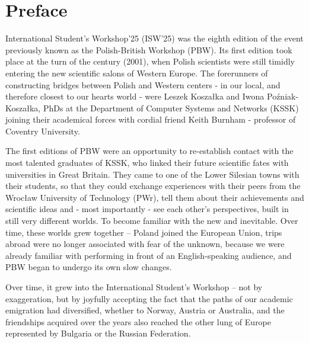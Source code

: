 \documentclass[
    letterpaper,
    10pt,%
    printed,%
    twoside,
    twosidepapers,
    papers=countpages,%
    paperselec=all, %
    hyperref={
        bookmarksdepth=1,
        bookmarksopen,
        bookmarksopenlevel=0,%
        linkcolor=blue,urlcolor=blue
    },%
    geometry={
        text={122truemm,126truemm},%
        inner=1.85in,top=35.00mm,
        bottom=50.00mm,footskip=10.00mm,
        voffset=-5mm
    },
]{confproc}
\begin{document}
\section*{Preface}
\vspace*{1.1cm}
\doublespace
\begin{center}
  \begin{minipage}[h]{14cm}
    International Student's Workshop'25 (ISW'25) was the eighth edition of the event previously known as the Polish-British Workshop (PBW). Its first edition took place at the turn of the century (2001), when Polish scientists were still timidly entering the new scientific salons of Western Europe. The forerunners of constructing bridges between Polish and Western centers - in our local, and therefore closest to our hearts world - were Leszek Koszałka and Iwona Poźniak-Koszałka, PhDs at the Department of Computer Systems and Networks (KSSK) joining their academical forces with cordial friend Keith Burnham - professor of Coventry University.
  \end{minipage}
\end{center}
\begin{center}
  \begin{minipage}[h]{14cm}
    The first editions of PBW were an opportunity to re-establish contact with the most talented graduates of KSSK, who linked their future scientific fates with universities in Great Britain. They came to one of the Lower Silesian towns with their students, so that they could exchange experiences with their peers from the Wrocław University of Technology (PWr), tell them about their achievements and scientific ideas and - most importantly - see each other's perspectives, built in still very different worlds. To become familiar with the new and inevitable. Over time, these worlds grew together -- Poland joined the European Union, trips abroad were no longer associated with fear of the unknown, because we were already familiar with performing in front of an English-speaking audience, and PBW began to undergo its own slow changes.
  \end{minipage}
\end{center}
\begin{center}
  \begin{minipage}[h]{14cm}  
      Over time, it grew into the International Student's Workshop -- not by exaggeration, but by joyfully accepting the fact that the paths of our academic emigration had diversified, whether to Norway, Austria or Australia, and the friendships acquired over the years also reached the other lung of Europe represented by Bulgaria or the Russian Federation.
  \end{minipage}
\end{center}
\end{document}
